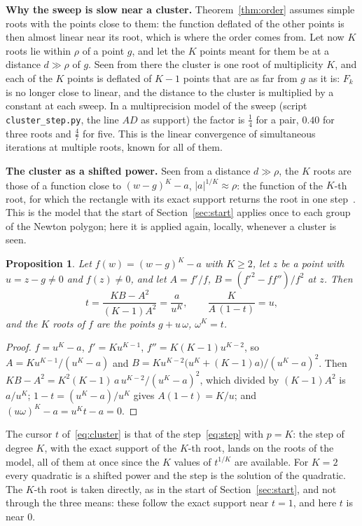 \documentclass[10pt,a4paper]{article}
\newtheorem{proposition}[theorem]{Proposition}
\theoremstyle{definition}
\numberwithin{equation}{section}
\begin{document}
\textbf{Why the sweep is slow near a cluster.} Theorem~\ref{thm:order} assumes simple roots with the
points close to them: the function deflated of the other points is then almost linear near its root,
which is where the order comes from. Let now $K$ roots lie within $\rho$ of a point $g$, and let the $K$
points meant for them be at a distance $d\gg\rho$ of $g$. Seen from there the cluster is one root of
multiplicity $K$, and each of the $K$ points is deflated of $K-1$ points that are as far from $g$ as it
is: $F_k$ is no longer close to linear, and the distance to the cluster is multiplied by a constant at
each sweep. In a multiprecision model of the sweep (script \texttt{cluster\_step.py}, the line $AD$ as
support) the factor is $\frac14$ for a pair, $0.40$ for three roots and $\frac47$ for five. This is the
linear convergence of simultaneous iterations at multiple roots, known for all of them.

\textbf{The cluster as a shifted power.} Seen from a distance $d\gg\rho$, the $K$ roots are those of a
function close to $(w-g)^K-a$, $|a|^{1/K}\approx\rho$: the function of the $K$-th root, for which the
rectangle with its exact support returns the root in one step~\cite{c5}. This is the model that the
start of Section~\ref{sec:start} applies once to each group of the Newton polygon; here it is applied
again, locally, whenever a cluster is seen.

\begin{proposition}\label{prop:cluster}
Let $f(w)=(w-g)^K-a$ with $K\ge2$, let $z$ be a point with $u=z-g\ne0$ and $f(z)\ne0$, and let
$A=f'/f$, $B=(f'^2-ff'')/f^2$ at $z$. Then
\begin{equation}\label{eq:cluster}
 t=\frac{KB-A^2}{(K-1)A^2}=\frac{a}{u^K},\qquad \frac{K}{A\,(1-t)}=u,
\end{equation}
and the $K$ roots of $f$ are the points $g+u\,\omega$, $\omega^K=t$.
\end{proposition}
\begin{proof}
$f=u^K-a$, $f'=Ku^{K-1}$, $f''=K(K-1)u^{K-2}$, so $A=Ku^{K-1}/(u^K-a)$ and
$B=Ku^{K-2}\bigl(u^K+(K-1)a\bigr)/(u^K-a)^2$. Then $KB-A^2=K^2(K-1)\,a\,u^{K-2}/(u^K-a)^2$, which
divided by $(K-1)A^2$ is $a/u^K$; $1-t=(u^K-a)/u^K$ gives $A(1-t)=K/u$; and
$(u\omega)^K-a=u^Kt-a=0$.
\end{proof}
The cursor $t$ of~\eqref{eq:cluster} is that of the step~\eqref{eq:step} with $p=K$: the step of
degree $K$, with the exact support of the $K$-th root, lands on the roots of the model, all of them at
once since the $K$ values of $t^{1/K}$ are available. For $K=2$ every quadratic is a shifted power and the
step is the solution of the quadratic. The $K$-th root is taken directly, as in the start of
Section~\ref{sec:start}, and not through the three means: these follow the exact support near $t=1$, and
here $t$ is near $0$.
\end{document}
